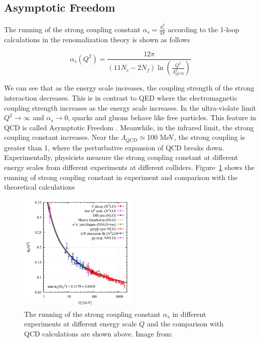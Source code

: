 \subsection{Asymptotic Freedom}

The running of the strong coupling constant $\alpha_s = \frac{g_s^2}{4\pi}$ according to the 1-loop calculations in the renomalization theory \cite{QCDRunning} is shown as follows

\begin{equation}
\alpha_{s} (Q^2) = \frac{12\pi}{(11 N_{c} - 2 N_{f}) \ln(\frac{Q^2}{\Lambda_{QCD}^2})}
\end{equation}

We can see that as the energy scale increases, the coupling strength of the strong interaction decreases. This is in contrast to QED where the electromagnetic coupling strength increases as the energy scale increases. In the ultra-violate limit $Q^2 \rightarrow \infty$ and $\alpha_{s} \rightarrow 0$, quarks and gluons behave like free particles. This feature in QCD is called Asymptotic Freedom \cite{QCDAsym}. Meanwhile, in the infrared limit, the strong coupling constant increases. Near the $\Lambda_{QCD} \simeq$100 MeV, the strong coupling is greater than 1, where the perturbative expansion of QCD breaks down. Experimentally, physicists measure the strong coupling constant at different energy scales from different experiments at different colliders. Figure~\ref{QCDCoupling} \cite{AlphaTheoEx} shows the running of strong coupling constant in experiment and comparison with the theoretical calculations 

\begin{figure}[hbtp]
\begin{center}
\includegraphics[width=0.50\textwidth]{Figures/Chapter1/QCDCoupling.png}
\caption{The running of the strong coupling constant $\alpha_s$ in different experiments at different energy scale $Q$ and the comparison with QCD calculations are shown above. Image from: \cite{AlphaTheoEx}}
\label{QCDCoupling}
\end{center}
\end{figure} 

